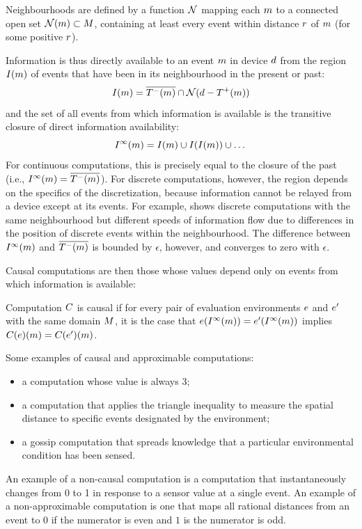 \documentclass[12pt,a4paper,twoside,openright]{book}
\begin{document}
\begin{thrdefn}[Neighbourhood]\label{def:neighborhood}
  Neighbourhoods are defined by a function $\mathcal{N}$ mapping each $m$ to a connected open set $\mathcal{N}(m) \subset M$, containing at least every event within distance $r$ of $m$ (for some positive $r$).
\end{thrdefn}
\noindent
Information is thus directly available to an event $m$ in device $d$ from the region $I(m)$ of events that have been in its neighbourhood in the present or past:
%
$$I(m) = \overline{T^-({m})} \cap \mathcal{N}(d-T^+({m}))$$
%
and the set of all events from which information is available is the transitive closure of direct information availability:
%
$$I^\infty(m) = I(m) \cup I(I(m)) \cup \dots$$
%
For continuous computations, this is precisely equal to the closure of the past (i.e., $I^\infty(m) = \overline{T^-({m})}$).  For discrete computations, however, the region depends on the specifics of the discretization, because information cannot be relayed from a device except at its events.
%
For example,  shows discrete computations with the same neighbourhood but different speeds of information flow due to differences in the position of discrete events within the neighbourhood.
%
The difference between $I^\infty(m)$ and $\overline{T^-({m})}$ is bounded by $\epsilon$, however, and converges to zero with $\epsilon$.

Causal computations are then those whose values depend only on events from which information is available:
\begin{thrdefn}[Causality]
  Computation $C$ is causal if for every pair of evaluation environments $e$ and $e'$ with the same domain $M$, it is the case that $e(I^\infty(m)) = e'(I^\infty(m))$ implies $C(e)(m) = C(e')(m)$.
\end{thrdefn}
\noindent
Some examples of causal and approximable computations:
\begin{itemize}
\item a computation whose value is always 3;
\item a computation that applies the triangle inequality to measure the spatial distance to specific events designated by the environment;
\item a gossip computation that spreads knowledge that a particular environmental condition has been sensed.
\end{itemize}
%
An example of a non-causal computation is a computation that instantaneously changes from 0 to 1 in response to a sensor value at a single event.  
%
An example of a non-approximable computation is one that maps all rational distances from an event to $0$ if the numerator is even and $1$ is the numerator is odd.
\end{document}

